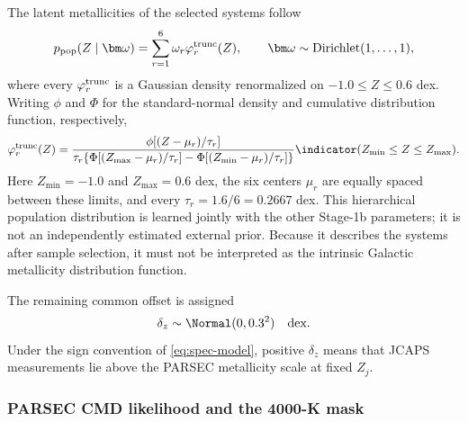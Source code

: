 The latent metallicities of the selected systems follow
\begin{equation}
 p_{\rm pop}(Z\mid\bm\omega)=\sum_{r=1}^{6}\omega_r
 \varphi_r^{\rm trunc}(Z),\qquad
 \bm\omega\sim\operatorname{Dirichlet}(1,\ldots,1),
 \label{eq:pop}
\end{equation}
where every $\varphi_r^{\rm trunc}$ is a Gaussian density renormalized on
$-1.0\le Z\le0.6$ dex.  Writing $\phi$ and $\Phi$ for the standard-normal
density and cumulative distribution function, respectively,
\begin{equation}
 \varphi_r^{\rm trunc}(Z)=
 \frac{\phi[(Z-\mu_r)/\tau_r]}
 {\tau_r\!\left\{\Phi[(Z_{\max}-\mu_r)/\tau_r]
 -\Phi[(Z_{\min}-\mu_r)/\tau_r]\right\}}
 \indicator(Z_{\min}\le Z\le Z_{\max}).
 \label{eq:truncated-gaussian-basis}
\end{equation}
Here $Z_{\min}=-1.0$ and $Z_{\max}=0.6$ dex, the six centers $\mu_r$ are
equally spaced between these limits, and every $\tau_r=1.6/6=0.2667$ dex.
This hierarchical population distribution is learned jointly with the other
Stage-1b parameters; it is not an independently estimated external prior.
Because it describes the systems after sample selection, it must not be
interpreted as the intrinsic Galactic metallicity distribution function.

The remaining common offset is assigned
\begin{equation}
 \delta_z\sim\Normal(0,0.3^2)\quad\text{dex}.
 \label{eq:delta-prior}
\end{equation}
Under the sign convention of \cref{eq:spec-model}, positive $\delta_z$ means
that JCAPS measurements lie above the PARSEC metallicity scale at fixed $Z_j$.

\subsubsection{PARSEC CMD likelihood and the 4000-K mask}

